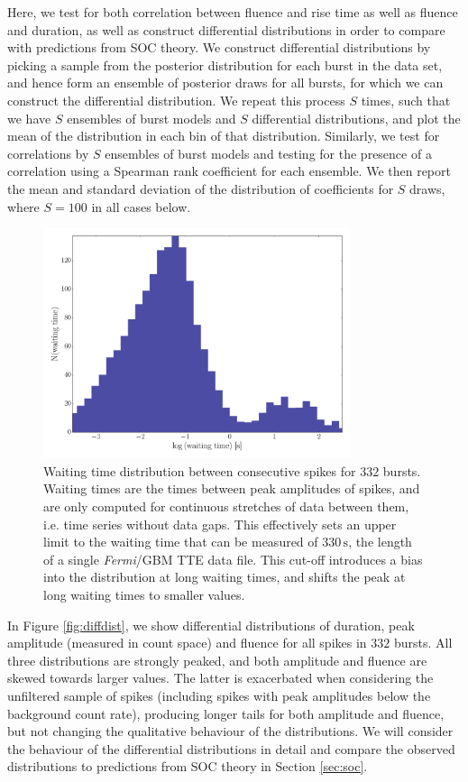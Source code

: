 \documentclass[12pt]{emulateapj}
\newcommand{\project}[1]{\textsl{#1}}
\newcommand{\fermi}{\project{Fermi}}
\begin{document}
 Here, we test for both correlation between fluence and rise time as well as fluence and duration, as well as construct differential distributions
 in order to compare with predictions from SOC theory. We construct differential distributions by picking a sample from the posterior distribution
 for each burst in the data set, and hence form an ensemble of posterior draws for all bursts, for which we can construct the differential distribution.
 We repeat this process $S$ times, such that we have $S$ ensembles of burst models and $S$ differential distributions, and plot the mean of the distribution in
 each bin of that distribution. 
 Similarly, we test for correlations by $S$ ensembles of burst models and testing for the presence of a correlation using a Spearman rank
 coefficient for each ensemble. We then report the mean and standard deviation of the distribution of coefficients for $S$ draws, where $S = 100$ in all cases below.
  \begin{figure}[htbp]
\begin{center}
\includegraphics[width=9cm]{sgr1550_waitingtimes.pdf}
\caption{Waiting time distribution between consecutive spikes for $332$ bursts. Waiting times are the times between peak amplitudes of spikes, and are only computed for
continuous stretches of data between them, i.e. time series without data gaps. This effectively sets an upper limit to the waiting time that can be measured of $330\,\mathrm{s}$, the 
length of a single \fermi/GBM TTE data file. This cut-off introduces a bias into the distribution at long waiting times, and shifts the peak at long waiting times to smaller values.}
\label{fig:waitingtimes}
\end{center}
\end{figure}
 
 In Figure \ref{fig:diffdist}, we show differential distributions of duration, peak amplitude (measured in count space) and fluence for all spikes in $332$ bursts. All three distributions are
 strongly peaked, and both amplitude and fluence are skewed towards larger values. The latter is exacerbated when considering the unfiltered sample of 
 spikes (including spikes with peak amplitudes below the background count rate), producing longer tails for both amplitude and fluence, but not changing the qualitative behaviour of the distributions. We will consider the behaviour of
 the differential distributions in detail and compare the observed distributions to predictions from SOC theory in Section \ref{sec:soc}.
\end{document}
